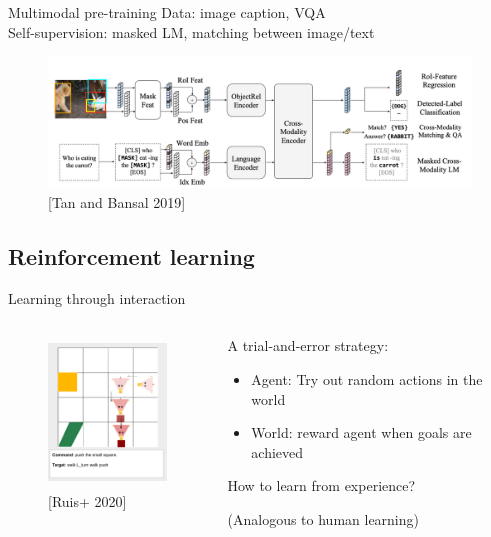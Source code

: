 \documentclass[usenames,dvipsnames,11pt,aspectratio=169]{beamer}
\begin{document}
\begin{frame}
    {Multimodal pre-training}
    Data: image caption, VQA \\
    Self-supervision: masked LM, matching between image/text

    \vspace{-1em}
    \begin{figure}
        \includegraphics[height=3.5cm]{figures/lxmert}
        \caption{[Tan and Bansal 2019]}
    \end{figure}
\end{frame}

\subsection{Reinforcement learning}
\begin{frame}
    {Learning through interaction}
    \begin{columns}
        \begin{column}{0.4\textwidth}
    \begin{figure}
        \includegraphics[height=4cm]{figures/instruction}
        \caption{[Ruis+ 2020]}
    \end{figure}
        \end{column}
        \begin{column}{0.6\textwidth}
    A trial-and-error strategy:\\
    \begin{itemize}
        \item Agent: Try out random actions in the world 
        \item World: reward agent when goals are achieved
    \end{itemize}
            \medskip

    How to learn from experience?
            \medskip

            (Analogous to human learning)
        \end{column}
    \end{columns}
\end{frame}
\end{document}
